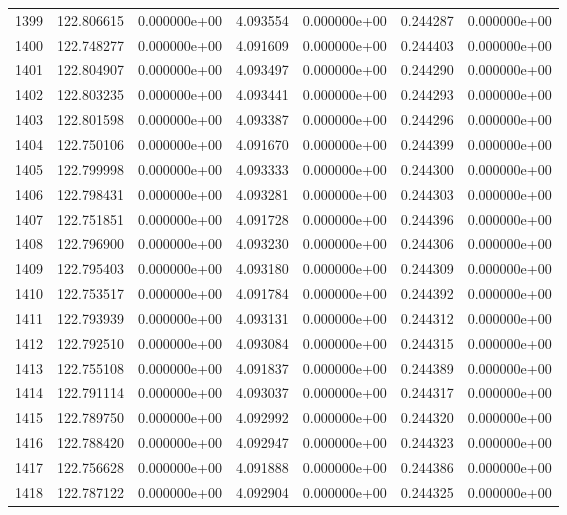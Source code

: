 \begin{tabular}{rrrrrrr}
1399 & 122.806615 &  0.000000e+00 &  4.093554 &  0.000000e+00 &    0.244287 &  0.000000e+00 \\
1400 & 122.748277 &  0.000000e+00 &  4.091609 &  0.000000e+00 &    0.244403 &  0.000000e+00 \\
1401 & 122.804907 &  0.000000e+00 &  4.093497 &  0.000000e+00 &    0.244290 &  0.000000e+00 \\
1402 & 122.803235 &  0.000000e+00 &  4.093441 &  0.000000e+00 &    0.244293 &  0.000000e+00 \\
1403 & 122.801598 &  0.000000e+00 &  4.093387 &  0.000000e+00 &    0.244296 &  0.000000e+00 \\
1404 & 122.750106 &  0.000000e+00 &  4.091670 &  0.000000e+00 &    0.244399 &  0.000000e+00 \\
1405 & 122.799998 &  0.000000e+00 &  4.093333 &  0.000000e+00 &    0.244300 &  0.000000e+00 \\
1406 & 122.798431 &  0.000000e+00 &  4.093281 &  0.000000e+00 &    0.244303 &  0.000000e+00 \\
1407 & 122.751851 &  0.000000e+00 &  4.091728 &  0.000000e+00 &    0.244396 &  0.000000e+00 \\
1408 & 122.796900 &  0.000000e+00 &  4.093230 &  0.000000e+00 &    0.244306 &  0.000000e+00 \\
1409 & 122.795403 &  0.000000e+00 &  4.093180 &  0.000000e+00 &    0.244309 &  0.000000e+00 \\
1410 & 122.753517 &  0.000000e+00 &  4.091784 &  0.000000e+00 &    0.244392 &  0.000000e+00 \\
1411 & 122.793939 &  0.000000e+00 &  4.093131 &  0.000000e+00 &    0.244312 &  0.000000e+00 \\
1412 & 122.792510 &  0.000000e+00 &  4.093084 &  0.000000e+00 &    0.244315 &  0.000000e+00 \\
1413 & 122.755108 &  0.000000e+00 &  4.091837 &  0.000000e+00 &    0.244389 &  0.000000e+00 \\
1414 & 122.791114 &  0.000000e+00 &  4.093037 &  0.000000e+00 &    0.244317 &  0.000000e+00 \\
1415 & 122.789750 &  0.000000e+00 &  4.092992 &  0.000000e+00 &    0.244320 &  0.000000e+00 \\
1416 & 122.788420 &  0.000000e+00 &  4.092947 &  0.000000e+00 &    0.244323 &  0.000000e+00 \\
1417 & 122.756628 &  0.000000e+00 &  4.091888 &  0.000000e+00 &    0.244386 &  0.000000e+00 \\
1418 & 122.787122 &  0.000000e+00 &  4.092904 &  0.000000e+00 &    0.244325 &  0.000000e+00 \\

\end{tabular}
